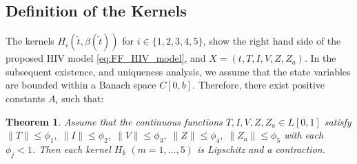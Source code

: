 \documentclass{article}
\theoremstyle{plain}
\newtheorem{theorem}{Theorem}[section]
\theoremstyle{definition}
\numberwithin{equation}{section}
\begin{document}
\subsection{Definition of the Kernels}
The kernels $H_i(\tilde{t}, \beta(\tilde{t}))$ for $i \in \{1, 2, 3, 4, 5\}$, show the right hand side of the proposed HIV model \eqref{eq:FF_HIV_model}, and $ X = (t, T, I, V, Z, Z_a)$.
In the subsequent existence, and uniqueness analysis, we assume that the state variables are bounded within a Banach space $C[0, b]$. Therefore, there exist positive constants $A_i$ such that:
\begin{theorem}
Assume that the continuous functions \(T, I, V, Z, Z_a \in L[0,1]\) satisfy 
\(\|T\| \leq \phi_1,\; \|I\| \leq \phi_2,\; \|V\| \leq \phi_3,\; \|Z\| \leq \phi_4,\; \|Z_a\| \leq \phi_5\) 
with each \(\phi_j < 1\). Then each kernel \(H_k\;(m=1,\dots,5)\) is Lipschitz and a contraction.
\end{theorem}
\end{document}
